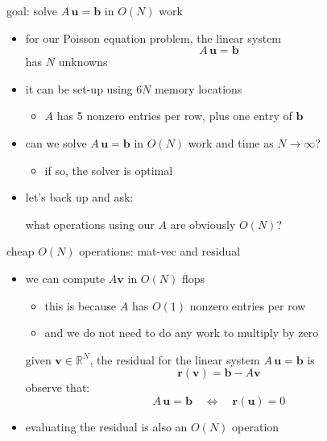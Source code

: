 \documentclass[10pt,
               svgnames,
               hyperref={colorlinks,citecolor=DeepPink4,linkcolor=FireBrick,urlcolor=Maroon},
               usepdftitle=false]{beamer}
\newcommand{\bb}{\mathbf{b}}
\newcommand{\br}{\mathbf{r}}
\newcommand{\bu}{\mathbf{u}}
\newcommand{\bv}{\mathbf{v}}
\newcommand{\RR}{\mathbb{R}}
\begin{document}
\begin{frame}{goal: solve $A\,\bu=\bb$ in $O(N)$ work}

\begin{itemize}
\item for our Poisson equation problem, the linear system
    $$A\,\bu=\bb$$
has $N$ unknowns
\item it can be set-up using $6N$ memory locations
	\begin{itemize}
	\item[$\circ$] $A$ has 5 nonzero entries per row, plus one entry of $\bb$
	\end{itemize}

\bigskip
\item can we solve $A\,\bu=\bb$ in $O(N)$ work and time as $N\to\infty$?
	\begin{itemize}
	\item[$\circ$] if so, the solver is \alert{optimal}
	\end{itemize}

\bigskip
\item let's back up and ask:

\medskip
\qquad what operations using our $A$ are obviously $O(N)$?
\end{itemize}
\end{frame}


\begin{frame}{cheap $O(N)$ operations: mat-vec and residual}

\begin{itemize}
\item we can compute $A\bv$ in $O(N)$ flops
	\begin{itemize}
	\item[$\circ$] this is because $A$ has $O(1)$ nonzero entries per row
	\item[$\circ$] and \alert{we do not need to do any work to multiply by zero}
	\end{itemize}

\bigskip
\begin{definition} given $\bv \in\RR^N$, the \alert{residual} for the linear system $A\,\bu=\bb$ is
	$$\br(\bv) = \bb - A\bv$$
observe that:
    $$A\,\bu = \bb \quad \iff \quad \br(\bu) = 0$$
\end{definition}

\item \alert{evaluating the residual is also an $O(N)$ operation}
\end{itemize}
\end{frame}
\end{document}
